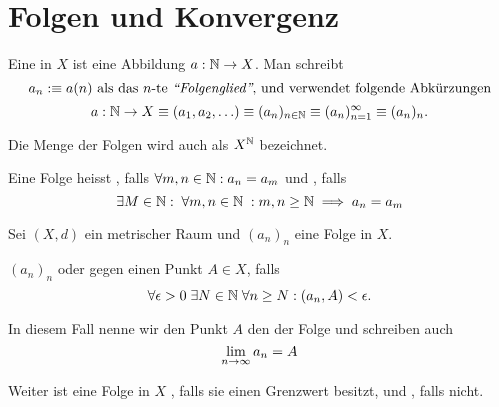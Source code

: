 \section{Folgen und Konvergenz}

\setcounter{thm}{19}
\begin{mydef}[Folge]
	Eine  in $X$ ist eine Abbildung $a: \mathbb{N} \to X$. Man schreibt
	\begin{equation}
    a_n :\equiv a(n) $ als das $n$-te \qt{Folgenglied}, und verwendet folgende Abkürzungen$
	\end{equation}
  \begin{equation}
  	a: \mathbb{N} \to X \equiv (a_1, a_2, \ldots) \equiv (a_n)_{n\in\mathbb{N}} \equiv(a_n)_{n=1}^{\infty} \equiv (a_n)_n.
  \end{equation}
  
	Die Menge der Folgen wird auch als $X^{\mathbb{N}}$ bezeichnet.
	
	Eine Folge heisst , falls $\forall m,n \in \mathbb{N}: a_n=a_m$ und , falls 
	\begin{equation}
		\exists M\in \mathbb{N}: \; \forall m,n \in \mathbb{N} \; : m,n \geq \mathbb{N} \implies a_n = a_m
	\end{equation}
\end{mydef}

\begin{mydef}[Konvergenz]
	Sei $(X,d)$ ein metrischer Raum und $(a_n)_n$ eine Folge in $X$.
	
	$(a_n)_n$  oder  gegen einen Punkt $A\in X$, falls 
	\begin{equation}
		\forall \epsilon > 0 \; \exists N \in \mathbb{N} \; \forall n \geq N: (a_n, A) < \epsilon.
	\end{equation}
	
	In diesem Fall nenne wir den Punkt $A$ den  der Folge und schreiben auch
	\begin{equation}
		\lim_{n \to \infty} a_n = A
	\end{equation}
	
	Weiter ist eine Folge in $X$ , falls sie einen Grenzwert besitzt, und , falls nicht.
\end{mydef}


